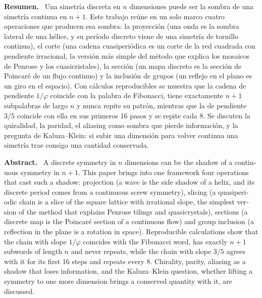 \documentclass[11pt,a4paper]{article}
\title{\titulo}
\author{Bruno Loiacono\\[2pt]\small Estudiante de Física, Universidad de Buenos Aires}
\date{Noviembre de 2026\\[8pt]\fbox{\small Preprint, documento de trabajo sin revisión por pares}}
\newenvironment{resumen}{\par\noindent\small\textbf{Resumen.}\ }{\par\medskip}
\newenvironment{abstractEN}{\par\noindent\small\begin{otherlanguage}{english}\textbf{Abstract.}\ }{\end{otherlanguage}\par\medskip}
\begin{document}
\maketitle
\thispagestyle{fancy}

\begin{resumen}
Una simetría discreta en $n$ dimensiones puede ser la sombra de una simetría continua en $n+1$. Este trabajo reúne en un solo marco cuatro operaciones que producen esa sombra: la proyección (una onda es la sombra lateral de una hélice, y su período discreto viene de una simetría de tornillo continua), el corte (una cadena cuasiperiódica es un corte de la red cuadrada con pendiente irracional, la versión más simple del método que explica los mosaicos de Penrose y los cuasicristales), la sección (un mapa discreto es la sección de Poincaré de un flujo continuo) y la inclusión de grupos (un reflejo en el plano es un giro en el espacio). Con cálculos reproducibles se muestra que la cadena de pendiente $1/\varphi$ coincide con la palabra de Fibonacci, tiene exactamente $n+1$ subpalabras de largo $n$ y nunca repite su patrón, mientras que la de pendiente $3/5$ coincide con ella en sus primeros 16 pasos y se repite cada 8. Se discuten la quiralidad, la paridad, el aliasing como sombra que pierde información, y la pregunta de Kaluza--Klein: si subir una dimensión para volver continua una simetría trae consigo una cantidad conservada.
\end{resumen}

\begin{abstractEN}
A discrete symmetry in $n$ dimensions can be the shadow of a continuous symmetry in $n+1$. This paper brings into one framework four operations that cast such a shadow: projection (a wave is the side shadow of a helix, and its discrete period comes from a continuous screw symmetry), slicing (a quasiperiodic chain is a slice of the square lattice with irrational slope, the simplest version of the method that explains Penrose tilings and quasicrystals), sections (a discrete map is the Poincaré section of a continuous flow) and group inclusion (a reflection in the plane is a rotation in space). Reproducible calculations show that the chain with slope $1/\varphi$ coincides with the Fibonacci word, has exactly $n+1$ subwords of length $n$ and never repeats, while the chain with slope $3/5$ agrees with it for its first 16 steps and repeats every 8. Chirality, parity, aliasing as a shadow that loses information, and the Kaluza--Klein question, whether lifting a symmetry to one more dimension brings a conserved quantity with it, are discussed.
\end{abstractEN}
\end{document}
